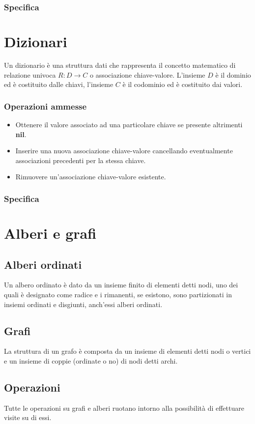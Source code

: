 \subsubsection{Specifica}

\section{Dizionari}
Un dizionario \`e una struttura dati che rappresenta il concetto matematico di relazione univoca $R:D\rightarrow C$ o associazione chiave-valore. L'insieme
$D$ \`e il dominio ed \`e costituito dalle chiavi, l'insieme $C$ \`e il codominio ed \`e costituito dai valori.
\subsubsection{Operazioni ammesse}
\begin{itemize}
    \item Ottenere il valore associato ad una particolare chiave se presente altrimenti \textbf{nil}.
    \item Inserire una nuova associazione chiave-valore cancellando eventualmente associazioni precedenti per la stessa chiave.
    \item Rimuovere un'associazione chiave-valore esistente.
\end{itemize}
\subsubsection{Specifica}

\section{Alberi e grafi}
\subsection{Alberi ordinati}
Un albero ordinato \`e dato da un insieme finito di elementi detti nodi, uno dei quali \`e designato come radice e i rimanenti, se esistono, sono
partizionati in insiemi ordinati e disgiunti, anch'essi alberi ordinati.
\subsection{Grafi}
La struttura di un grafo \`e composta da un insieme di elementi detti nodi o vertici e un insieme di coppie (ordinate o no) di nodi detti archi.
\subsection{Operazioni}
Tutte le operazioni su grafi e alberi ruotano intorno alla possibilit\`a di effettuare visite su di essi.
